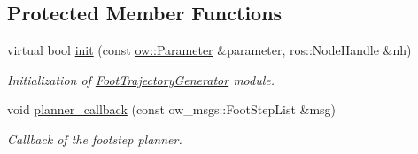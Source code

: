 \subsection*{Protected Member Functions}
\begin{DoxyCompactItemize}
\item 
virtual bool \hyperlink{classow__ftg_1_1FootTrajectoryGenerator_a76ea67492cbcedb85dce1ad5ec43699f}{init} (const \hyperlink{classow_1_1Parameter}{ow\+::\+Parameter} \&parameter, ros\+::\+Node\+Handle \&nh)\hypertarget{classow__ftg_1_1FootTrajectoryGenerator_a76ea67492cbcedb85dce1ad5ec43699f}{}\label{classow__ftg_1_1FootTrajectoryGenerator_a76ea67492cbcedb85dce1ad5ec43699f}

\begin{DoxyCompactList}\small\item\em Initialization of \hyperlink{classow__ftg_1_1FootTrajectoryGenerator}{Foot\+Trajectory\+Generator} module. \end{DoxyCompactList}\item 
void \hyperlink{classow__ftg_1_1FootTrajectoryGenerator_a8aae28a8c9dbf19b5629413b044a99cb}{planner\+\_\+callback} (const ow\+\_\+msgs\+::\+Foot\+Step\+List \&msg)\hypertarget{classow__ftg_1_1FootTrajectoryGenerator_a8aae28a8c9dbf19b5629413b044a99cb}{}\label{classow__ftg_1_1FootTrajectoryGenerator_a8aae28a8c9dbf19b5629413b044a99cb}

\begin{DoxyCompactList}\small\item\em Callback of the footstep planner. \end{DoxyCompactList}\end{DoxyCompactItemize}
